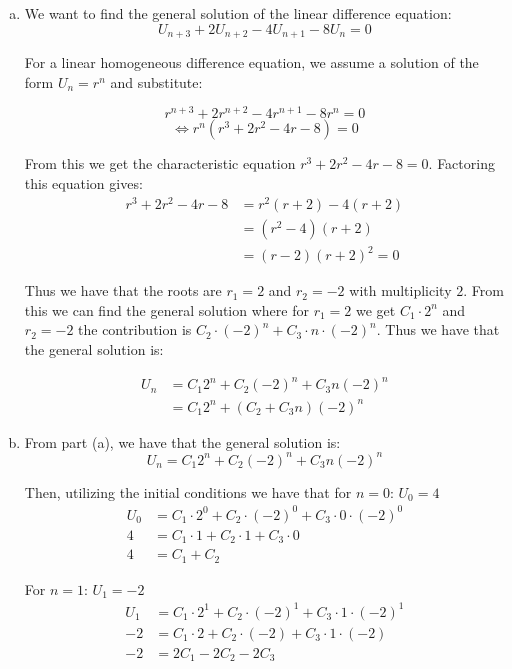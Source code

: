 \documentclass{article}
\begin{document}
\begin{enumerate}[(a)]
    \item We want to find the general solution of the linear difference equation:
        $$U_{n+3} + 2U_{n+2} - 4U_{n+1} - 8U_n = 0$$

        For a linear homogeneous difference equation, we assume a solution of the form $U_n = r^n$ and substitute:

        $$r^{n+3} + 2r^{n+2} - 4r^{n+1} - 8r^n = 0$$
        $$\iff r^n(r^3 + 2r^2 - 4r - 8) = 0$$

        From this we get the characteristic equation $r^3 + 2r^2 - 4r - 8 = 0$. Factoring this equation gives: 
        \begin{align*}
            r^3 + 2r^2 - 4r - 8 &= r^2(r + 2) - 4(r + 2) \\
            &= (r^2 - 4)(r + 2) \\
            &= (r - 2)(r + 2)^2 = 0
        \end{align*}

        Thus we have that the roots are $r_1 = 2$ and $r_2 = -2$ with multiplicity $2$. From this we can find the general solution where for $r_1 = 2$ we get $C_1 \cdot 2^n$ and $r_2 = -2$ the contribution is $C_2 \cdot (-2)^n + C_3 \cdot n \cdot (-2)^n$.
        Thus we have that the general solution is:

        \begin{align*}
            U_n &= C_1 2^n + C_2 (-2)^n + C_3 n (-2)^n \\
            &= C_1 2^n + (C_2 + C_3 n) (-2)^n
        \end{align*}

        \item From part (a), we have that the general solution is:
            \[ U_n = C_1 2^n + C_2 (-2)^n + C_3 n (-2)^n \]

            Then, utilizing the initial conditions we have that for $n = 0$: $U_0 = 4$
            \begin{align*}
                U_0 &= C_1 \cdot 2^0 + C_2 \cdot (-2)^0 + C_3 \cdot 0 \cdot (-2)^0 \\
                4 &= C_1 \cdot 1 + C_2 \cdot 1 + C_3 \cdot 0 \\
                4 &= C_1 + C_2 \tag{Q4.1}
            \end{align*}

            For $n = 1$: $U_1 = -2$
            \begin{align*}
                U_1 &= C_1 \cdot 2^1 + C_2 \cdot (-2)^1 + C_3 \cdot 1 \cdot (-2)^1 \\
                -2 &= C_1 \cdot 2 + C_2 \cdot (-2) + C_3 \cdot 1 \cdot (-2) \\
                -2 &= 2C_1 - 2C_2 - 2C_3 \tag{Q4.2}
            \end{align*}
            

\end{enumerate}
\end{document}
